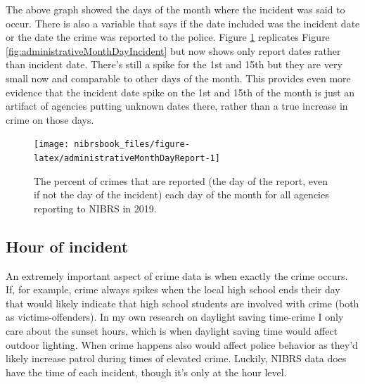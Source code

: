 \documentclass[
  12pt,
  openany]{book}
\begin{document}
The above graph showed the days of the month where the incident was said to occur. There is also a variable that says if the date included was the incident date or the date the crime was reported to the police. Figure \ref{fig:administrativeMonthDayReport} replicates Figure \ref{fig:administrativeMonthDayIncident} but now shows only report dates rather than incident date. There's still a spike for the 1st and 15th but they are very small now and comparable to other days of the month. This provides even more evidence that the incident date spike on the 1st and 15th of the month is just an artifact of agencies putting unknown dates there, rather than a true increase in crime on those days.

\begin{figure}

{\centering \texttt{[image: nibrsbook\_files/figure-latex/administrativeMonthDayReport-1]} 

}

\caption{The percent of crimes that are reported (the day of the report, even if not the day of the incident) each day of the month for all agencies reporting to NIBRS in 2019.}\label{fig:administrativeMonthDayReport}
\end{figure}

\hypertarget{hour-of-incident}{%
\subsection{Hour of incident}\label{hour-of-incident}}

An extremely important aspect of crime data is when exactly the crime occurs. If, for example, crime always spikes when the local high school ends their day that would likely indicate that high school students are involved with crime (both as victims-offenders). In my own research on daylight saving time-crime I only care about the sunset hours, which is when daylight saving time would affect outdoor lighting. When crime happens also would affect police behavior as they'd likely increase patrol during times of elevated crime. Luckily, NIBRS data does have the time of each incident, though it's only at the hour level.
\end{document}
